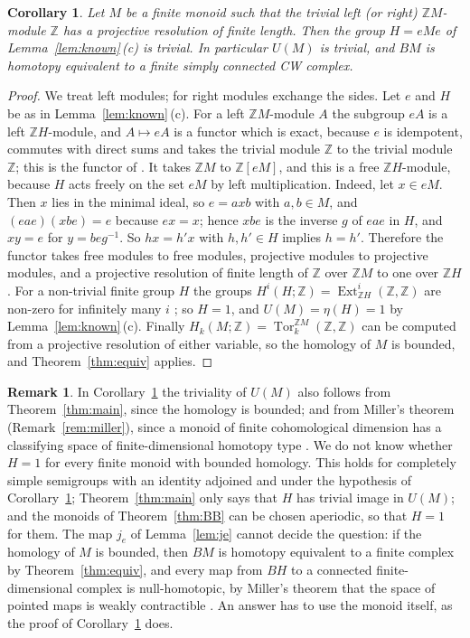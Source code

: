 \documentclass[11pt,a4paper]{article}
\newtheorem{corollary}[theorem]{Corollary}
\theoremstyle{definition}
\newtheorem{remark}[theorem]{Remark}
\newcommand{\Z}{\mathbb{Z}}
\newcommand{\Ext}{\operatorname{Ext}}
\newcommand{\Tor}{\operatorname{Tor}}
\begin{document}
\begin{corollary}\label{cor:cd}
Let $M$ be a finite monoid such that the trivial left \textup{(}or
right\textup{)} $\Z M$-module $\Z$ has a projective resolution of finite
length. Then the group $H=eMe$ of Lemma~\ref{lem:known}\,\textup{(c)} is
trivial. In particular $U(M)$ is trivial, and $BM$ is homotopy equivalent to
a finite simply connected CW complex.
\end{corollary}

\begin{proof}
We treat left modules; for right modules exchange the sides. Let $e$ and $H$
be as in Lemma~\ref{lem:known}\,(c). For a left $\Z M$-module $A$ the
subgroup $eA$ is a left $\Z H$-module, and $A\mapsto eA$ is a functor which
is exact, because $e$ is idempotent, commutes with direct sums and takes the
trivial module $\Z$ to the trivial module $\Z$; this is the functor of
\cite[Lemmas~2--4 and Theorem~2]{GP}. It takes $\Z M$ to $\Z[eM]$, and this
is a free $\Z H$-module, because $H$ acts freely on the set $eM$ by left
multiplication. Indeed, let $x\in eM$. Then $x$ lies in the minimal ideal, so
$e=axb$ with $a,b\in M$, and $(eae)(xbe)=e$ because $ex=x$; hence $xbe$ is
the inverse $g$ of $eae$ in $H$, and $xy=e$ for $y=beg^{-1}$. So $hx=h'x$
with $h,h'\in H$ implies $h=h'$. Therefore the functor takes free modules to
free modules, projective modules to projective modules, and a projective
resolution of finite length of $\Z$ over $\Z M$ to one over $\Z H$. For a
non-trivial finite group $H$ the groups $H^i(H;\Z)=\Ext^i_{\Z H}(\Z,\Z)$ are
non-zero for infinitely many $i$ \cite[Corollary~1]{Swan}; so $H=1$, and
$U(M)=\eta(H)=1$ by Lemma~\ref{lem:known}\,(c). Finally
$H_k(M;\Z)=\Tor_k^{\Z M}(\Z,\Z)$ can be computed from a projective resolution
of either variable, so the homology of $M$ is bounded, and
Theorem~\ref{thm:equiv} applies.
\end{proof}

\begin{remark}\label{rem:cd}
In Corollary~\ref{cor:cd} the triviality of $U(M)$ also follows from
Theorem~\ref{thm:main}, since the homology is bounded; and from Miller's
theorem (Remark~\ref{rem:miller}), since a monoid of finite cohomological
dimension has a classifying space of finite-dimensional homotopy type
\cite[Theorem~6.27 and Corollary~6.7]{GS}. We do not know whether $H=1$ for
every finite monoid with bounded homology. This holds for completely simple
semigroups with an identity adjoined \cite[Theorem~A]{St} and under the
hypothesis of Corollary~\ref{cor:cd}; Theorem~\ref{thm:main} only says that
$H$ has trivial image in $U(M)$; and the monoids of Theorem~\ref{thm:BB} can
be chosen aperiodic, so that $H=1$ for them. The map $j_e$ of
Lemma~\ref{lem:je} cannot decide the question: if the homology of $M$ is
bounded, then $BM$ is homotopy equivalent to a finite complex by
Theorem~\ref{thm:equiv}, and every map from $BH$ to a connected
finite-dimensional complex is null-homotopic, by Miller's theorem that the
space of pointed maps is weakly contractible \cite[Theorem~A, p.~39]{Mi}. An
answer has to use the monoid itself, as the proof of
Corollary~\ref{cor:cd} does.
\end{remark}
\end{document}
